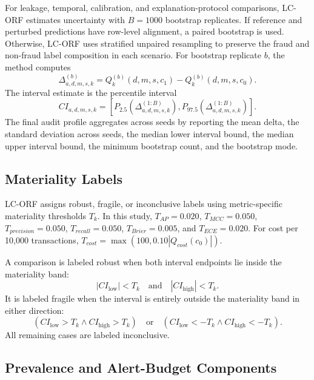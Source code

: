 For leakage, temporal, calibration, and explanation-protocol comparisons, LC-ORF estimates uncertainty with $B=1000$ bootstrap replicates. If reference and perturbed predictions have row-level alignment, a paired bootstrap is used. Otherwise, LC-ORF uses stratified unpaired resampling to preserve the fraud and non-fraud label composition in each scenario. For bootstrap replicate $b$, the method computes
\begin{equation}
\Delta^{(b)}_{a,d,m,s,k}
= Q^{(b)}_k(d,m,s,c_1) - Q^{(b)}_k(d,m,s,c_0).
\end{equation}
The interval estimate is the percentile interval
\begin{equation}
CI_{a,d,m,s,k}
= \left[
P_{2.5}\left(\Delta^{(1:B)}_{a,d,m,s,k}\right),
P_{97.5}\left(\Delta^{(1:B)}_{a,d,m,s,k}\right)
\right].
\end{equation}
The final audit profile aggregates across seeds by reporting the mean delta, the standard deviation across seeds, the median lower interval bound, the median upper interval bound, the minimum bootstrap count, and the bootstrap mode.

\subsection{Materiality Labels}

LC-ORF assigns robust, fragile, or inconclusive labels using metric-specific materiality thresholds $T_k$. In this study, $T_{AP}=0.020$, $T_{MCC}=0.050$, $T_{precision}=0.050$, $T_{recall}=0.050$, $T_{Brier}=0.005$, and $T_{ECE}=0.020$. For cost per 10,000 transactions, $T_{cost}=\max(100,0.10|Q_{cost}(c_0)|)$.

A comparison is labeled robust when both interval endpoints lie inside the materiality band:
\begin{equation}
|CI_{\mathrm{low}}| < T_k
\quad \text{and} \quad
|CI_{\mathrm{high}}| < T_k.
\end{equation}
It is labeled fragile when the interval is entirely outside the materiality band in either direction:
\begin{equation}
(CI_{\mathrm{low}} > T_k \land CI_{\mathrm{high}} > T_k)
\quad \text{or} \quad
(CI_{\mathrm{low}} < -T_k \land CI_{\mathrm{high}} < -T_k).
\end{equation}
All remaining cases are labeled inconclusive.

\subsection{Prevalence and Alert-Budget Components}

